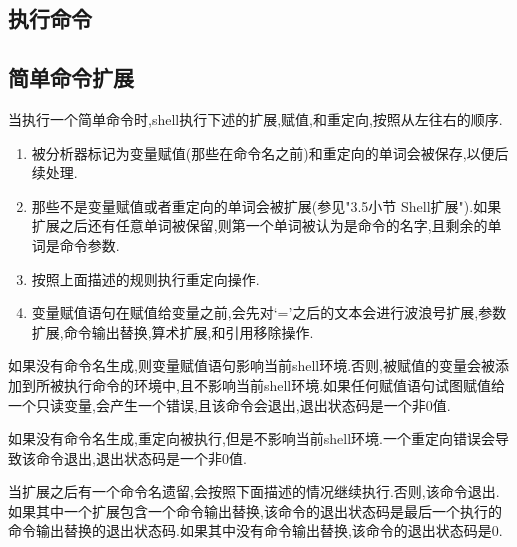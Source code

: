\documentclass[draft,openany]{book}
\begin{document}
\begin{CJK}{UTF8}{gbsn}
    \section{执行命令}

    \subsection{简单命令扩展}
    当执行一个简单命令时,shell执行下述的扩展,赋值,和重定向,按照从左往右的顺序.\par
    \begin{enumerate}
        \item 被分析器标记为变量赋值(那些在命令名之前)和重定向的单词会被保存,以便后续处理.
        \item 那些不是变量赋值或者重定向的单词会被扩展(参见"3.5小节 Shell扩展").如果扩展之后还有任意单词被保留,则第一个单词被认为是命令的名字,且剩余的单词是命令参数.
        \item 按照上面描述的规则执行重定向操作.
        \item 变量赋值语句在赋值给变量之前,会先对`='之后的文本会进行波浪号扩展,参数扩展,命令输出替换,算术扩展,和引用移除操作.
    \end{enumerate}
    如果没有命令名生成,则变量赋值语句影响当前shell环境.否则,被赋值的变量会被添加到所被执行命令的环境中,且不影响当前shell环境.如果任何赋值语句试图赋值给一个只读变量,会产生一个错误,且该命令会退出,退出状态码是一个非0值.\par
    如果没有命令名生成,重定向被执行,但是不影响当前shell环境.一个重定向错误会导致该命令退出,退出状态码是一个非0值.\par
    当扩展之后有一个命令名遗留,会按照下面描述的情况继续执行.否则,该命令退出.如果其中一个扩展包含一个命令输出替换,该命令的退出状态码是最后一个执行的命令输出替换的退出状态码.如果其中没有命令输出替换,该命令的退出状态码是0.


\end{CJK}
\end{document}
